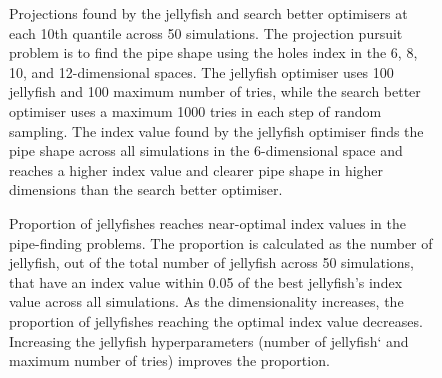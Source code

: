 \documentclass[
  number,
  preprint,
  3p]{elsarticle}
\begin{document}
\begin{figure}


\caption{\label{fig-proj}Projections found by the jellyfish and search
better optimisers at each 10th quantile across 50 simulations. The
projection pursuit problem is to find the pipe shape using the holes
index in the 6, 8, 10, and 12-dimensional spaces. The jellyfish
optimiser uses 100 jellyfish and 100 maximum number of tries, while the
search better optimiser uses a maximum 1000 tries in each step of random
sampling. The index value found by the jellyfish optimiser finds the
pipe shape across all simulations in the 6-dimensional space and reaches
a higher index value and clearer pipe shape in higher dimensions than
the search better optimiser.}

\end{figure}%

\begin{figure}


\caption{\label{fig-proportion}Proportion of jellyfishes reaches
near-optimal index values in the pipe-finding problems. The proportion
is calculated as the number of jellyfish, out of the total number of
jellyfish across 50 simulations, that have an index value within 0.05 of
the best jellyfish's index value across all simulations. As the
dimensionality increases, the proportion of jellyfishes reaching the
optimal index value decreases. Increasing the jellyfish hyperparameters
(number of jellyfish` and maximum number of tries) improves the
proportion.}

\end{figure}%
\end{document}
